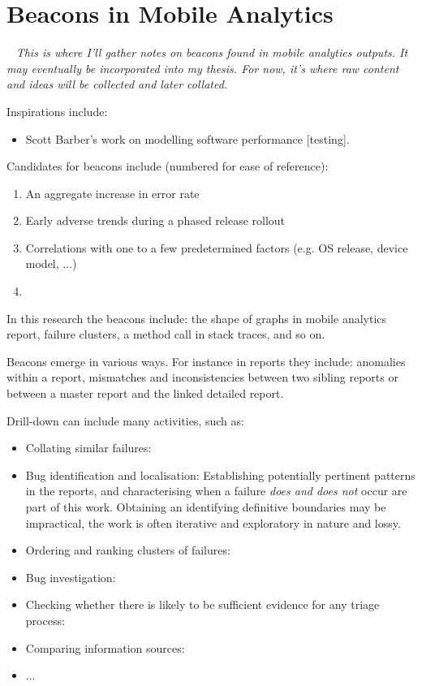 \section{Beacons in Mobile Analytics}~\label{beacons-in-mobile-analytics}
\textit{This is where I'll gather notes on beacons found in mobile analytics outputs. It may eventually be incorporated into my thesis. For now, it's where raw content and ideas will be collected and later collated.}

Inspirations include:
\begin{itemize}
    \item Scott Barber's work on modelling software performance [testing].
\end{itemize}

Candidates for beacons include (numbered for ease of reference):
\begin{enumerate}
    \item An aggregate increase in error rate
    \item Early adverse trends during a phased release rollout
    \item Correlations with one to a few predetermined factors (e.g. OS release, device model, ...)
    \item 
\end{enumerate}

In this research the beacons include: the shape of graphs in mobile analytics report, failure clusters, a method call in stack traces, and so on.


Beacons emerge in various ways. For instance in reports they include: anomalies within a report, mismatches and inconsistencies between two sibling reports or between a master report and the linked detailed report.


Drill-down can include many activities, such as:
 
 \begin{itemize}
    \itemsep0em
    \item Collating similar failures: 
    \item Bug identification and localisation: Establishing potentially pertinent patterns in the reports, and characterising when a failure \emph{does and does not} occur are part of this work. Obtaining an identifying definitive boundaries may be impractical, the work is often iterative and exploratory in nature and lossy. 
    \item Ordering and ranking clusters of failures:
    \item Bug investigation:
    \item Checking whether there is likely to be sufficient evidence for any triage process: 
    \item Comparing information sources:
    \item ...
\end{itemize}
